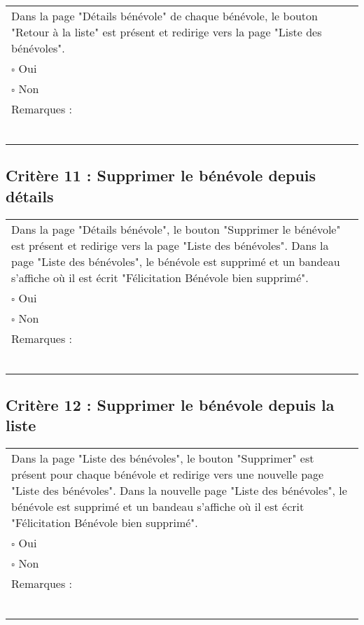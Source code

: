 	\begin{center}
    	 		\begin{tabular}[h]{|p{}|}
			\hline
				Dans la page "Détails bénévole" de chaque bénévole, le bouton "Retour à la liste" est présent et redirige vers la page "Liste des bénévoles".\\
				$\square$ Oui  \\ $\square$ Non \\\hline Remarques : \\ ~\\
			 \\\hline
     		\end{tabular}
  		\end{center}	
  		
  		
  		\subsection*{Critère 11 : Supprimer le bénévole depuis détails}
	
	\begin{center}
    	 		\begin{tabular}[h]{|p{}|}
			\hline
				Dans la page "Détails bénévole", le bouton "Supprimer le bénévole" est présent et redirige vers la page "Liste des bénévoles". Dans la page "Liste des bénévoles", le bénévole est supprimé et un bandeau s'affiche où il est écrit "Félicitation Bénévole bien supprimé".\\
				$\square$ Oui  \\ $\square$ Non \\\hline Remarques : \\ ~\\
			 \\\hline
     		\end{tabular}
  		\end{center}
  		
  		
  		
  			\subsection*{Critère 12 : Supprimer le bénévole depuis la liste}
	
	\begin{center}
    	 		\begin{tabular}[h]{|p{}|}
			\hline
				Dans la page "Liste des bénévoles", le bouton "Supprimer" est présent pour chaque bénévole et redirige vers une nouvelle page "Liste des bénévoles". Dans la nouvelle page "Liste des bénévoles", le bénévole est supprimé et un bandeau s'affiche où il est écrit "Félicitation Bénévole bien supprimé".\\
				$\square$ Oui  \\ $\square$ Non \\\hline Remarques : \\ ~\\
			 \\\hline
     		\end{tabular}
  		\end{center}

